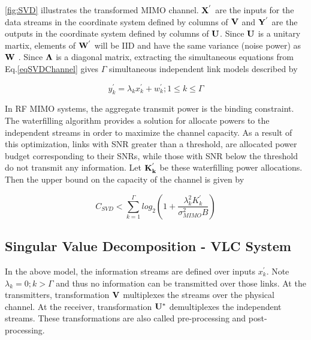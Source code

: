 \figurename{ {\ref{fig:SVD}}} illustrates the transformed MIMO channel. $\bf{X}^{'}$ are the inputs for the data streams in the coordinate system defined by columns of $\bf{V}$ and $\bf{Y}^{'}$ are the outputs in the coordinate system defined by columns of $\bf{U}$. Since $\bf{U}$ is a unitary martix, elements of $\bf{W}^{'}$ will be IID and have the same variance (noise power) as $\bf{W}$ \cite{tse05a}. Since $\bf{\Lambda}$ is a diagonal matrix, extracting the simultaneous equations from Eq.\ref{eqSVDChannel} gives $\Gamma$ simultaneous independent link models described by
 
\begin{equation}
	\label{eqSVDChannel2}
	y^{'}_{k} = \lambda_{k}x^{'}_{k} + w^{'}_{k}; 1\leq{k}\leq\Gamma
\end{equation}

In RF MIMO systems, the aggregate transmit power is the binding constraint. The waterfilling algorithm \cite{gol97a} provides a solution for allocate powers to the independent streams in order to maximize the channel capacity. As a result of this optimization, links with SNR greater than a threshold, are allocated power budget corresponding to their SNRs, while those with SNR below the threshold do not transmit any information. Let ${\bf{K}^{'}_{k}}$ be these waterfilling power allocations. Then the upper bound on the capacity of the channel is given by

\begin{equation}
	\label{eqSVDCap}
	C_{SVD} < \sum_{k=1}^{\Gamma}log_{2}\left(1 + \frac{\lambda_{k}^{2} {K}^{'}_{k}}{\sigma_{MIMO}^{2}B}\right)
\end{equation}


\subsection{Singular Value Decomposition - VLC System}
\label{subsec:svdvlcSystem}
In the above model, the information streams are defined over inputs $x^{'}_{k}$. Note $\lambda_{k}=0; k>\Gamma$ and thus no information can be transmitted over those links. At the transmitters, transformation $\bf{V}$ multiplexes the streams over the physical channel. At the receiver,  transformation $\bf{U}^{*}$ demultiplexes the independent streams. These transformations are also called pre-processing and post-processing.

